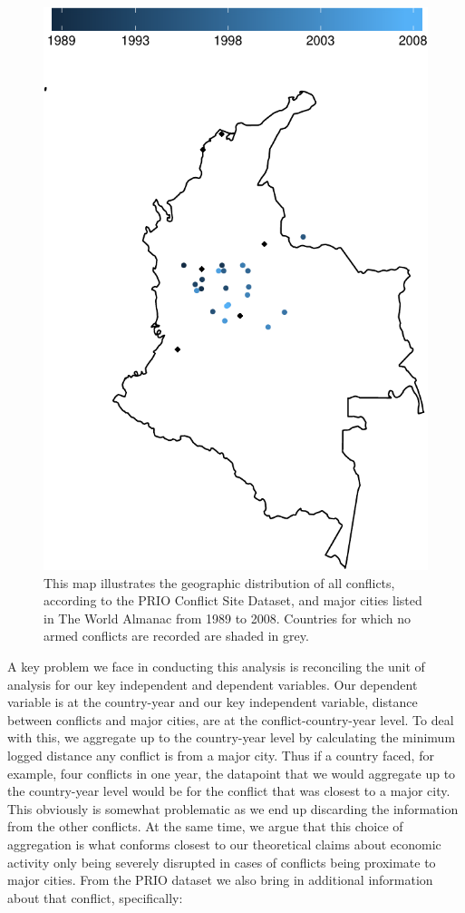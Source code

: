 \begin{figure}[ht]
	\centering
	\includegraphics[width=.7\textwidth]{colombiaMap-crop}
	\caption{This map illustrates the geographic distribution of all conflicts, according to the PRIO Conflict Site Dataset, and major cities listed in The World Almanac from 1989 to 2008. Countries for which no armed conflicts are recorded are shaded in grey.}
	\label{fig:columbiaMap}
\end{figure}

A key problem we face in conducting this analysis is reconciling the unit of analysis for our key independent and dependent variables. Our dependent variable is at the country-year and our key independent variable, distance between conflicts and major cities, are at the conflict-country-year level. To deal with this, we aggregate up to the country-year level by calculating the minimum logged distance any conflict is from a major city. Thus if a country faced, for example, four conflicts in one year, the datapoint that we would aggregate up to the country-year level would be for the conflict that was closest to a major city. This obviously is somewhat problematic as we end up discarding the information from the other conflicts. At the same time, we argue that this choice of aggregation is what conforms closest to our theoretical claims about economic activity only being severely disrupted in cases of conflicts being proximate to major cities. From the PRIO dataset we also bring in additional information about that conflict, specifically: 

